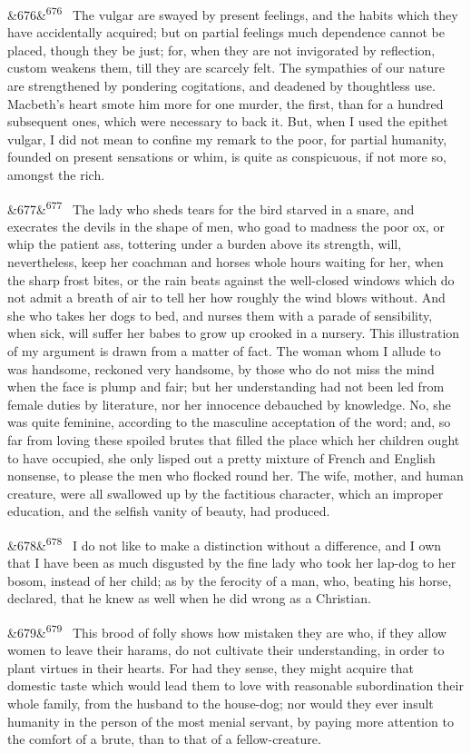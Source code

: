 \documentclass[12pt]{article}
\newcommand{\para}[1][]{\par\noindent\ifx&#1&\else\textsuperscript{\footnotesize #1}~\fi}
\begin{document}
\para[676] The vulgar are swayed by present feelings, and the habits which they have accidentally acquired; but on partial feelings much dependence cannot be placed, though they be just; for, when they are not invigorated by reflection, custom weakens them, till they are scarcely felt. The sympathies of our nature are strengthened by pondering cogitations, and deadened by thoughtless use. Macbeth's heart smote him more for one murder, the first, than for a hundred subsequent ones, which were necessary to back it. But, when I used the epithet vulgar, I did not mean to confine my remark to the poor, for partial humanity, founded on present sensations or whim, is quite as conspicuous, if not more so, amongst the rich.

\para[677] The lady who sheds tears for the bird starved in a snare, and execrates the devils in the shape of men, who goad to madness the poor ox, or whip the patient ass, tottering under a burden above its strength, will, nevertheless, keep her coachman and horses whole hours waiting for her, when the sharp frost bites, or the rain beats against the well-closed windows which do not admit a breath of air to tell her how roughly the wind blows without. And she who takes her dogs to bed, and nurses them with a parade of sensibility, when sick, will suffer her babes to grow up crooked in a nursery. This illustration of my argument is drawn from a matter of fact. The woman whom I allude to was handsome, reckoned very handsome, by those who do not miss the mind when the face is plump and fair; but her understanding had not been led from female duties by literature, nor her innocence debauched by knowledge. No, she was quite feminine, according to the masculine acceptation of the word; and, so far from loving these spoiled brutes that filled the place which her children ought to have occupied, she only lisped out a pretty mixture of French and English nonsense, to please the men who flocked round her. The wife, mother, and human creature, were all swallowed up by the factitious character, which an improper education, and the selfish vanity of beauty, had produced.

\para[678] I do not like to make a distinction without a difference, and I own that I have been as much disgusted by the fine lady who took her lap-dog to her bosom, instead of her child; as by the ferocity of a man, who, beating his horse, declared, that he knew as well when he did wrong as a Christian.

\para[679] This brood of folly shows how mistaken they are who, if they allow women to leave their harams, do not cultivate their understanding, in order to plant virtues in their hearts. For had they sense, they might acquire that domestic taste which would lead them to love with reasonable subordination their whole family, from the husband to the house-dog; nor would they ever insult humanity in the person of the most menial servant, by paying more attention to the comfort of a brute, than to that of a fellow-creature.
\end{document}

